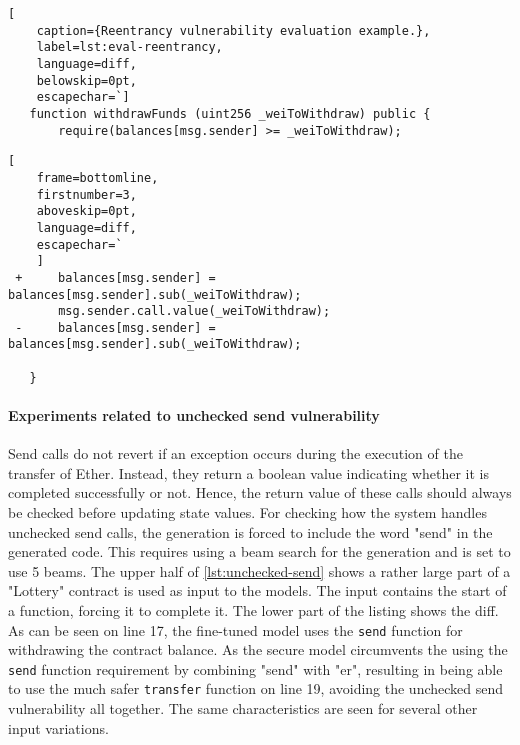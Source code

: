 \begin{lstlisting}[
    caption={Reentrancy vulnerability evaluation example.},
    label=lst:eval-reentrancy,
    language=diff,
    belowskip=0pt,
    escapechar=`]
   function withdrawFunds (uint256 _weiToWithdraw) public {
       require(balances[msg.sender] >= _weiToWithdraw);
\end{lstlisting}
\begin{lstlisting}[
    frame=bottomline,
    firstnumber=3,
    aboveskip=0pt,
    language=diff,
    escapechar=`
    ]
 +     balances[msg.sender] = balances[msg.sender].sub(_weiToWithdraw);
       msg.sender.call.value(_weiToWithdraw);
 -     balances[msg.sender] = balances[msg.sender].sub(_weiToWithdraw);

   }   
\end{lstlisting}

\paragraph{Experiments related to unchecked send vulnerability}
Send calls do not revert if an exception occurs during the execution of the transfer of Ether. Instead, they return a boolean value indicating whether it is completed successfully or not. Hence, the return value of these calls should always be checked before updating state values. For checking how the system handles unchecked send calls, the generation is forced to include the word "send" in the generated code. This requires using a beam search for the generation and is set to use 5 beams. The upper half of \cref{lst:unchecked-send} shows a rather large part of a "Lottery" contract is used as input to the models. The input contains the start of a function, forcing it to complete it. The lower part of the listing shows the diff. As can be seen on line 17, the fine-tuned model uses the \lstinline[language=Solidity]!send! function for withdrawing the contract balance. As the secure model circumvents the using the \lstinline[language=Solidity]!send! function requirement by combining "send"  with "er", resulting in being able to use the much safer \lstinline[language=Solidity]!transfer! function on line 19, avoiding the unchecked send vulnerability all together. The same characteristics are seen for several other input variations.

